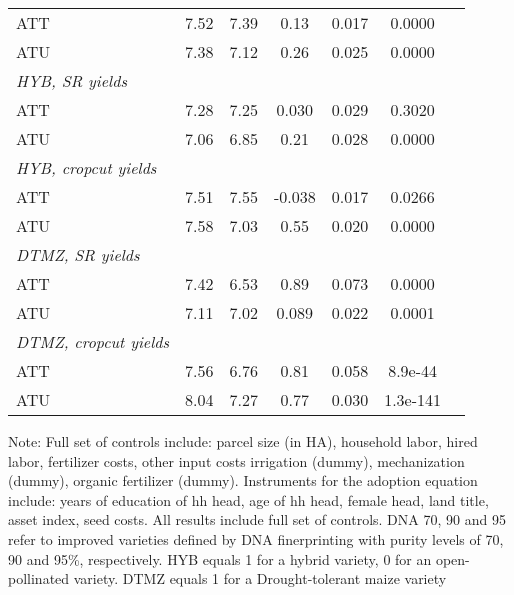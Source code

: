 \begin{table}[htbp]
\begin{threeparttable}
\begin{tabular}{l cccccc}
ATT         &        7.52&        7.39&        0.13&       0.017&      0.0000\\
%
%
%
ATU         &        7.38&        7.12&        0.26&       0.025&      0.0000\\
%
%
%
\textit{HYB, SR yields}&            &            &            &            &            \\
ATT         &        7.28&        7.25&       0.030&       0.029&      0.3020\\
%
%
%
ATU         &        7.06&        6.85&        0.21&       0.028&      0.0000\\
%
%
%
\textit{HYB, cropcut yields}&            &            &            &            &            \\
ATT         &        7.51&        7.55&      -0.038&       0.017&      0.0266\\
%
%
%
ATU         &        7.58&        7.03&        0.55&       0.020&      0.0000\\
%
%
%
\textit{DTMZ, SR yields}&            &            &            &            &            \\
ATT         &        7.42&        6.53&        0.89&       0.073&      0.0000\\
%
%
%
ATU         &        7.11&        7.02&       0.089&       0.022&      0.0001\\
%
%
%
\textit{DTMZ, cropcut yields}&            &            &            &            &            \\
ATT         &        7.56&        6.76&        0.81&       0.058&     8.9e-44\\
%
%
%
ATU         &        8.04&        7.27&        0.77&       0.030&    1.3e-141\\
\hline
\hline
\end{tabular}
\begin{tablenotes}
\footnotesize
\item{Note: Full set of controls include: parcel size (in HA), household labor, hired labor, fertilizer costs, other input costs irrigation (dummy), mechanization (dummy), organic fertilizer (dummy). Instruments for the adoption equation include: years of education of hh head, age of hh head, female head, land title, asset index, seed costs. All results include full set of controls. DNA 70, 90 and 95 refer to improved varieties defined by DNA finerprinting with purity levels of 70, 90 and 95\%, respectively. HYB equals 1 for a hybrid variety, 0 for an open-pollinated variety. DTMZ equals 1 for a Drought-tolerant maize variety}
\end{tablenotes}
\end{threeparttable}
\end{table}
